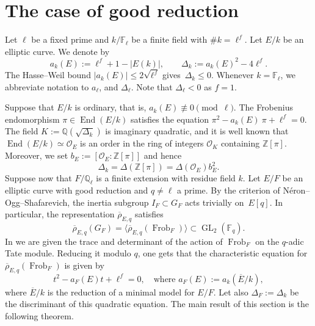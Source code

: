 \documentclass[12pt]{amsart}
\numberwithin{equation}{section}
\theoremstyle{definition}
\newcommand{\F}{\mathbb{F}}
\newcommand{\Q}{\mathbb{Q}}
\newcommand{\Z}{\mathbb{Z}}
\newcommand{\rhobar}{{\overline{\rho}}}
\newcommand{\calO}{\mathcal{O}}
\DeclareMathOperator{\GL}{GL}
\DeclareMathOperator{\Frob}{Frob}
\newcommand{\Ebar}{{\overline{E}}}
\DeclareMathOperator{\End}{End}
\newcommand{\cO}{\mathcal{O}}
\begin{document}
\section{The case of good reduction}\label{sec:goodred}

Let $\ell$ be a fixed prime and $k/\F_\ell$ be a finite field with $\#k=\ell^f$. Let $E/k$ be an elliptic curve. We denote by 
\[
a_k(E):=\ell^f+1-|E(k)|, \qquad \Delta_k:=a_k(E)^2-4\ell^f.
\]
The Hasse--Weil bound $|a_k(E)|\leq2\sqrt{\ell^f}$ gives~$\Delta_k \leq 0$.  
Whenever $k=\F_\ell$, we abbreviate notation to $a_{\ell}$, and $\Delta_{\ell}$. 
Note that $\Delta_\ell<0$ as $f=1$. 

Suppose that $E/k$ is ordinary, that is, $a_k(E) \not\equiv 0 \pmod{\ell}$. 
The Frobenius endomorphism $\pi\in \End(E/k)$  satisfies the equation $\pi^2-a_k(E) \:\pi+\ell^f=0$. The field $K :=\Q(\sqrt{\Delta_k})$ is imaginary quadratic, and it is well known that $\End(E/k) \simeq \calO_{E}$ is an order in the ring of integers $\cO_K$ containing $\Z[\pi]$. Moreover, we set $b_E:=[\cO_E: \Z[\pi]]$ and hence
\begin{equation}\label{discriminats}
      \Delta_k = \Delta(\Z[\pi])=\Delta(\cO_E)b_E^2.
\end{equation}
Suppose now that $F/\Q_\ell$ is a finite extension with residue field $k$.
Let $E/F$ be an elliptic curve with good reduction and $q \neq \ell$ a prime. By the criterion of N\'eron–Ogg–Shafarevich, the inertia subgroup $I_F \subset G_F$ acts trivially on~$E[q]$. In particular, the representation
$\rhobar_{E,q}$
satisfies $$\rhobar_{E,q}(G_{F})= \langle \rhobar_{E,q}(\Frob_F) \rangle\subset \GL_2(\F_q).$$ 
In \cite[IV, \S 1.3]{Serre1} we are given the trace and determinant of the action of $\Frob_F$ on the $q$-adic Tate module. Reducing it modulo $q$, one gets
that the characteristic equation for $\rhobar_{E,q}(\Frob_F)$ is given by
\begin{equation}\label{Frobeq}
		t^2- a_F(E)t+\ell^f=0, \quad\text{where } a_F(E):=a_k(\Ebar/k),
\end{equation}
where $\Ebar/k$ is the reduction of a minimal model for $E/F$.
Let also $\Delta_F:=\Delta_k$ be the discriminant of this quadratic equation.
The main result of this section is the following theorem.
\end{document}
